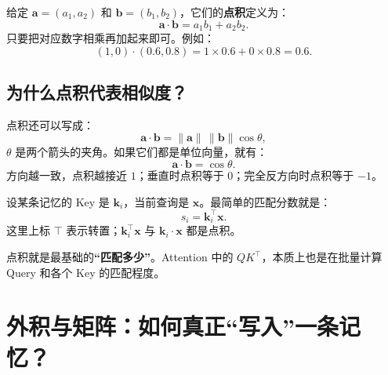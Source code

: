 \documentclass[11pt,a4paper,UTF8]{ctexart}
\numberwithin{equation}{section}
\newcommand{\vect}[1]{\boldsymbol{#1}}
\begin{document}
给定 $\vect{a}=(a_1,a_2)$ 和 $\vect{b}=(b_1,b_2)$，它们的\textbf{点积}定义为：
\begin{equation}
\boxed{\vect{a}\cdot\vect{b}=a_1b_1+a_2b_2.}
\end{equation}
只要把对应数字相乘再加起来即可。例如：
\[
(1,0)\cdot(0.6,0.8)=1\times0.6+0\times0.8=0.6.
\]

\subsection{为什么点积代表相似度？}
点积还可以写成：
\begin{equation}
\vect{a}\cdot\vect{b}=\|\vect{a}\|\,\|\vect{b}\|\cos\theta,
\end{equation}
$\theta$ 是两个箭头的夹角。如果它们都是单位向量，就有：
\begin{equation}
\boxed{\vect{a}\cdot\vect{b}=\cos\theta.}
\end{equation}
方向越一致，点积越接近 $1$；垂直时点积等于 $0$；完全反方向时点积等于 $-1$。

\begin{center}
\end{center}

设某条记忆的 Key 是 $\vect{k}_i$，当前查询是 $\vect{x}$。最简单的匹配分数就是：
\begin{equation}
\boxed{s_i=\vect{k}_i^\top\vect{x}.}
\end{equation}
这里上标 $\top$ 表示转置；$\vect{k}_i^\top\vect{x}$ 与 $\vect{k}_i\cdot\vect{x}$ 都是点积。

\begin{conclusion}
点积就是最基础的\textbf{“匹配多少”}。Attention 中的 $QK^\top$，本质上也是在批量计算 Query 和各个 Key 的匹配程度。
\end{conclusion}

\section{外积与矩阵：如何真正“写入”一条记忆？}
\end{document}
